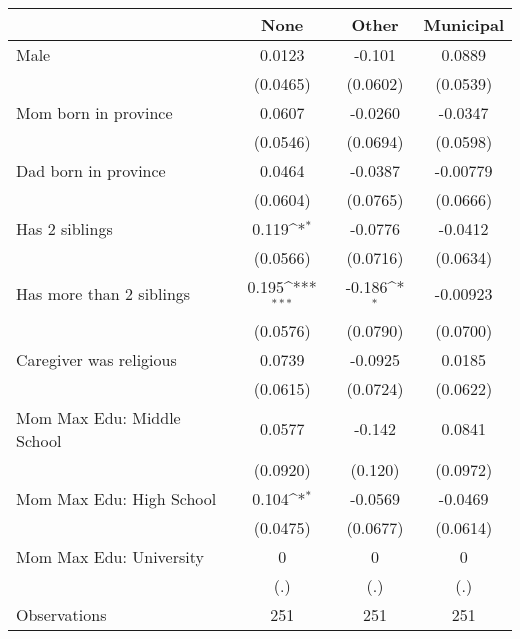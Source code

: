 {
\def\sym#1{\ifmmode^{#1}\else\(^{#1}\)\fi}
\begin{tabular}{l*{3}{c}}
\toprule
                    &\multicolumn{1}{c}{None}&\multicolumn{1}{c}{Other}&\multicolumn{1}{c}{Municipal}\\
\midrule
Male                &      0.0123         &      -0.101         &      0.0889         \\
                    &    (0.0465)         &    (0.0602)         &    (0.0539)         \\
\addlinespace
Mom born in province&      0.0607         &     -0.0260         &     -0.0347         \\
                    &    (0.0546)         &    (0.0694)         &    (0.0598)         \\
\addlinespace
Dad born in province&      0.0464         &     -0.0387         &    -0.00779         \\
                    &    (0.0604)         &    (0.0765)         &    (0.0666)         \\
\addlinespace
Has 2 siblings      &       0.119\sym{*}  &     -0.0776         &     -0.0412         \\
                    &    (0.0566)         &    (0.0716)         &    (0.0634)         \\
\addlinespace
Has more than 2 siblings&       0.195\sym{***}&      -0.186\sym{*}  &    -0.00923         \\
                    &    (0.0576)         &    (0.0790)         &    (0.0700)         \\
\addlinespace
Caregiver was religious&      0.0739         &     -0.0925         &      0.0185         \\
                    &    (0.0615)         &    (0.0724)         &    (0.0622)         \\
\addlinespace
Mom Max Edu: Middle School&      0.0577         &      -0.142         &      0.0841         \\
                    &    (0.0920)         &     (0.120)         &    (0.0972)         \\
\addlinespace
Mom Max Edu: High School&       0.104\sym{*}  &     -0.0569         &     -0.0469         \\
                    &    (0.0475)         &    (0.0677)         &    (0.0614)         \\
\addlinespace
Mom Max Edu: University&           0         &           0         &           0         \\
                    &         (.)         &         (.)         &         (.)         \\
\midrule
Observations        &         251         &         251         &         251         \\
\bottomrule
\end{tabular}
}
